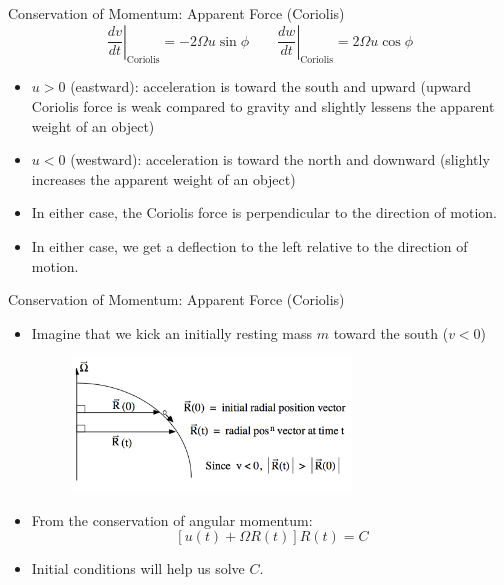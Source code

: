 \begin{frame}{Conservation of Momentum: Apparent Force (Coriolis)}
$$\left.\frac{dv}{dt}\right|_{\text{Coriolis}} = -2\Omega u \sin \phi \qquad \left.\frac{dw}{dt}\right|_{\text{Coriolis}} = 2\Omega u \cos \phi$$
	\begin{itemize}
	\item $u > 0$ (eastward): acceleration is toward the south and upward (upward Coriolis force is weak compared to gravity and slightly lessens the apparent weight of an object)
	\item $u < 0$ (westward): acceleration is toward the north and downward (slightly increases the apparent weight of an object)
	\item In either case, the Coriolis force is perpendicular to the direction of motion.
	\item In either case, we get a deflection to the left relative to the direction of motion.
\end{itemize}
\end{frame}
\begin{frame}{Conservation of Momentum: Apparent Force (Coriolis)}

\begin{itemize}
	\item Imagine that we kick an initially resting mass $m$ toward the south ($v<0$)
	\begin{figure}
		\includegraphics[width=0.7\textwidth]{coriolis3}	
	\end{figure}
	\item From the conservation of angular momentum:
	$$\left[ u(t) + \Omega R(t)\right]R(t) = C$$
	\item Initial conditions will help us solve $C$.
\end{itemize}
\end{frame}
